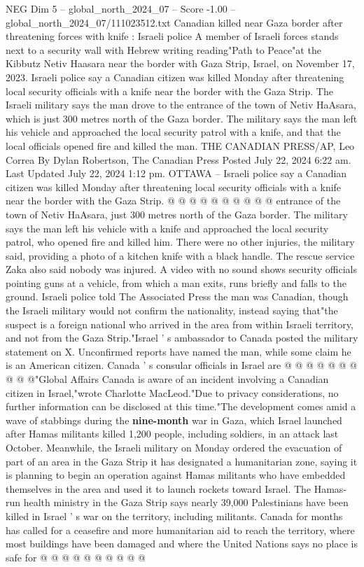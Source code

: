 \begin{textsample}{NEG Dim 5 – global\_north\_2024\_07 – Score -1.00 – global\_north\_2024\_07/111023512.txt}  \label{ex:f5_neg_148}
Canadian killed near Gaza border after threatening forces with knife : Israeli police A member of Israeli forces stands next to a security wall with Hebrew writing reading"Path to Peace"at the Kibbutz Netiv Haasara near the border with Gaza Strip, Israel, on November 17, 2023.
Israeli police say a Canadian citizen was killed Monday after threatening local security officials with a knife near the border with the Gaza Strip.
The Israeli military says the man drove to the entrance of the town of Netiv HaAsara, which is just 300 metres north of the Gaza border.
The military says the man left his vehicle and approached the local security patrol with a knife, and that the local officials opened fire and killed the man.
THE CANADIAN PRESS/AP, Leo Correa By Dylan Robertson, The Canadian Press Posted July 22, 2024 6:22 am.
Last Updated July 22, 2024 1:12 pm.
OTTAWA -- Israeli police say a Canadian citizen was killed Monday after threatening local security officials with a knife near the border with the Gaza Strip. @ @ @ @ @ @ @ @ @ @ entrance of the town of Netiv HaAsara, just 300 metres north of the Gaza border.
The military says the man left his vehicle with a knife and approached the local security patrol, who opened fire and killed him.
There were no other injuries, the military said, providing a photo of a kitchen knife with a black handle.
The rescue service Zaka also said nobody was injured.
A video with no sound shows security officials pointing guns at a vehicle, from which a man exits, runs briefly and falls to the ground.
Israeli police told The Associated Press the man was Canadian, though the Israeli military would not confirm the nationality, instead saying that"the suspect is a foreign national who arrived in the area from within Israeli territory, and not from the Gaza Strip."Israel ' s ambassador to Canada posted the military statement on X.
Unconfirmed reports have named the man, while some claim he is an American citizen.
Canada ' s consular officials in Israel are @ @ @ @ @ @ @ @ @ @"Global Affairs Canada is aware of an incident involving a Canadian citizen in Israel,"wrote Charlotte MacLeod."Due to privacy considerations, no further information can be disclosed at this time."The development comes amid a wave of stabbings during the \textbf{nine-month} war in Gaza, which Israel launched after Hamas militants killed 1,200 people, including soldiers, in an attack last October.
Meanwhile, the Israeli military on Monday ordered the evacuation of part of an area in the Gaza Strip it has designated a humanitarian zone, saying it is planning to begin an operation against Hamas militants who have embedded themselves in the area and used it to launch rockets toward Israel.
The Hamas-run health ministry in the Gaza Strip says nearly 39,000 Palestinians have been killed in Israel ' s war on the territory, including militants.
Canada for months has called for a ceasefire and more humanitarian aid to reach the territory, where most buildings have been damaged and where the United Nations says no place is safe for @ @ @ @ @ @ @ @ @ @

\end{textsample}
